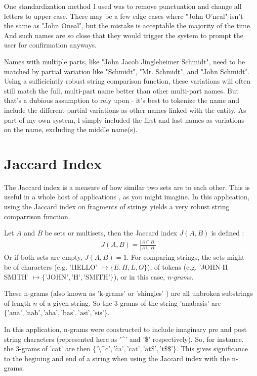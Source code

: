 \documentclass[11pt]{article}
\begin{document}
One standardization method I used was to remove punctuation and change all letters to upper case.
There may be a few edge cases where "John O'neal" isn't the same as "John Oneal",
but the mistake is acceptable the majority of the time. And such names are so close that they would
trigger the system to prompt the user for confirmation anyways.

Names with multiple parts, like "John Jacob Jingleheimer Schmidt", need to be matched by
partial variation like "Schmidt", "Mr. Schmidt", and "John Schmidt". 
Using a sufficieintly robust string comparison function, these variations will often 
still match the full, multi-part name better than other multi-part names.
But that's a dubious assumption to rely upon - it's best to tokenize the name and
include the different partial variations as other names linked with the entity.
As part of my own system, I simply included the first and last names as variations on
the name, excluding the middle name(s).

\section{Jaccard Index}
The Jaccard index is a measure of how similar two sets are to each other.
This is useful in a whole host of applications \cite{general}, as you might imagine. 
In this application, using the Jaccard index on fragments of strings yields a very
robust string comparrison function.

Let $A$ and $B$ be sets or multisets, then the Jaccard index $J(A,B)$ is defined \cite{mining, comparison}:
\begin{align*}
    J(A, B) = \frac{\left| A \cap B \right|}{\left| A \cup B \right|}
\end{align*}
Or if both sets are empty, $J(A,B) = 1$.
For comparing strings, the sets might be of characters (e.g. 'HELLO' $\mapsto \{E, H, L, O\}$), 
of tokens (e.g. 'JOHN H SMITH' $\mapsto \{\text{'JOHN'}, \text{'H'}, \text{'SMITH'}\}$),
or in this case, {\em n-grams}.

These n-grams (also known as 'k-grams' or 'shingles' \cite{mining}) are all unbroken substrings of 
length $n$ of a given string. So the 3-grams of the string 'anabasis' are 
$\{\text{'ana'}, \text{'nab'}, \text{'aba'}, \text{'bas'}, \text{'asi'}, \text{'sis'}\}$. 

In this application, n-grams were constructed to include imaginary pre and post string characters
(represented here as '\^{}' and '\$' respectively). So, for instance, the 3-grams of 'cat' are then
$\{\text{'\^{}\^{}c'}, \text{'\^{}ca'}, \text{'cat'}, \text{'at\$'}, \text{'t\$\$'}\}$. This gives
significance to the begining and end of a string when using the Jaccard index with the n-grams.
\end{document}
